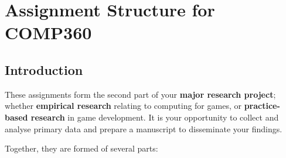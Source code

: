 \chapter{Assignment Structure for COMP360}

\section*{Introduction}

These assignments form the second part of your \textbf{major research project}; whether \textbf{empirical research} relating to computing for games, or \textbf{practice-based research} in game development. It is your opportunity to collect and analyse primary data and prepare a manuscript to disseminate your findings.

Together, they are formed of several parts:

